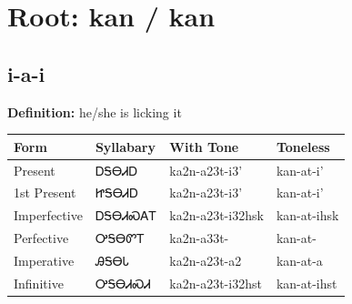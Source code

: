 \documentclass{article}%
\begin{document}
%
\normalsize%
\section*{Root: kan / kan}%
\subsection*{i-a-i}%
\textbf{Definition: }%
he/she is licking it%
\\[0.5em]%
\begin{tabular}{|l|l|l|l|}%
\hline%
\textbf{Form}&\textbf{Syllabary}&\textbf{With Tone}&\textbf{Toneless}\\%
\hline%
Present&ᎠᎦᎾᏗᎠ&ka2n{-}a23t{-}i3'&kan{-}at{-}i'\\%
1st Present&ᏥᎦᎾᏗᎠ&ka2n{-}a23t{-}i3'&kan{-}at{-}i'\\%
Imperfective&ᎠᎦᎾᏗᏍᎪᎢ&ka2n{-}a23t{-}i32hsk&kan{-}at{-}ihsk\\%
Perfective&ᎤᎦᎾᏛᎢ&ka2n{-}a33t{-}&kan{-}at{-}\\%
Imperative&ᎯᎦᎾᏓ&ka2n{-}a23t{-}a2&kan{-}at{-}a\\%
Infinitive&ᎤᎦᎾᏗᏍᏗ&ka2n{-}a23t{-}i32hst&kan{-}at{-}ihst\\%
\hline%
\end{tabular}%
\\[1em]%
\end{document}

